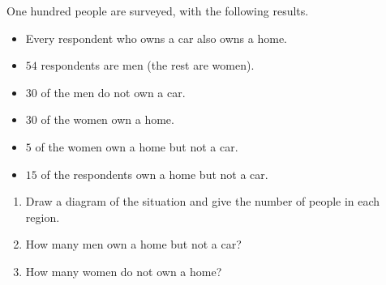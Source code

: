 One hundred people are surveyed, with the following results.
\begin{itemize}
\item Every respondent who owns a car also owns a home.
\item $54$ respondents are men (the rest are women).
\item $30$ of the men do not own a car.
\item $30$ of the women own a home.
\item $5$ of the women own a home but not a car.
\item $15$ of the respondents own a home but not a car.
\end{itemize}
\begin{enumerate}
\item[(a)] Draw a diagram of the situation and give the number of people in each region.
\item[(b)] How many men own a home but not a car?
\item[(c)] How many women do not own a home?
\end{enumerate}
